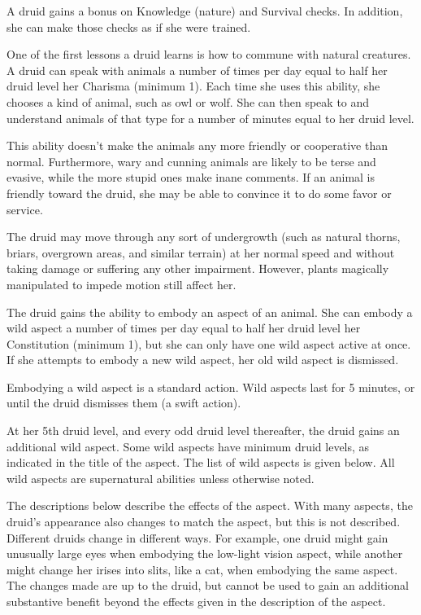  A druid gains a  bonus on Knowledge (nature) and Survival checks. In addition, she can make those checks as if she were trained.

 One of the first lessons a druid learns is how to commune with natural creatures. A druid can speak with animals a number of times per day equal to half her druid level \add her Charisma (minimum 1). Each time she uses this ability, she chooses a kind of animal, such as owl or wolf. She can then speak to and understand animals of that type for a number of minutes equal to her druid level.

This ability doesn't make the animals any more friendly or cooperative than normal. Furthermore, wary and cunning animals are likely to be terse and evasive, while the more stupid ones make inane comments. If an animal is friendly toward the druid, she may be able to convince it to do some favor or service.

 The druid may move through any sort of undergrowth (such as natural thorns, briars, overgrown areas, and similar terrain) at her normal speed and without taking damage or suffering any other impairment. However, plants magically manipulated to impede motion still affect her.

 The druid gains the ability to embody an aspect of an animal. She can embody a wild aspect a number of times per day equal to half her druid level \add her Constitution (minimum 1), but she can only have one wild aspect active at once. If she attempts to embody a new wild aspect, her old wild aspect is dismissed.

Embodying a wild aspect is a standard action. Wild aspects last for 5 minutes, or until the druid dismisses them (a swift action).

At her 5th druid level, and every odd druid level thereafter, the druid gains an additional wild aspect. Some wild aspects have minimum druid levels, as indicated in the title of the aspect. The list of wild aspects is given below. All wild aspects are supernatural abilities unless otherwise noted.

The descriptions below describe the effects of the aspect. With many aspects, the druid's appearance also changes to match the aspect, but this is not described. Different druids change in different ways. For example, one druid might gain unusually large eyes when embodying the low-light vision aspect, while another might change her irises into slits, like a cat, when embodying the same aspect. The changes made are up to the druid, but cannot be used to gain an additional substantive benefit beyond the effects given in the description of the aspect.

